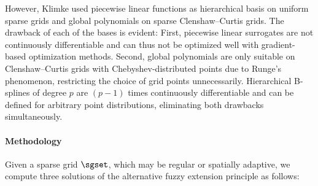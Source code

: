 However, Klimke used piecewise linear functions as hierarchical basis on
uniform sparse grids and global polynomials on sparse Clenshaw--Curtis grids.
The drawback of each of the bases is evident:
First, piecewise linear surrogates are not continuously differentiable and
can thus not be optimized well with gradient-based optimization methods.
Second, global polynomials are only suitable on Clenshaw--Curtis grids
with Chebyshev-distributed points due to Runge's phenomenon,
restricting the choice of grid points unnecessarily.
Hierarchical B-splines of degree $p$ are $(p - 1)$ times
continuously differentiable and can be defined for arbitrary point
distributions, eliminating both drawbacks simultaneously.

\paragraph{Methodology}

Given a sparse grid $\sgset$, which may be regular or spatially adaptive,
we compute three solutions of the alternative fuzzy extension principle
as follows:

